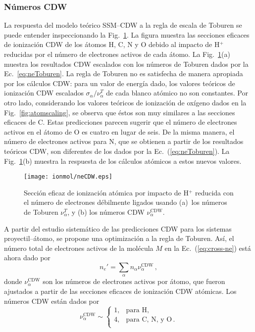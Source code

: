 \subsubsection{Números CDW}
\label{subsec:CDW}

La respuesta del modelo teórico SSM--CDW a la regla de escala de Toburen 
se puede entender inspeccionando la Fig.~\ref{fig:neCDW}. La figura 
muestra las secciones eficaces de ionización CDW de los átomos H, C, N y 
O debido al impacto de H$^+$ reducidas por el número de electrones 
activos de cada átomo. La Fig.~\ref{fig:neCDW}(a) muestra los resultados 
CDW escalados con los números de Toburen dados por la 
Ec.~\ref{eq:neToburen}. La regla de Toburen no es satisfecha de manera 
apropiada por los cálculos CDW: para un valor de energía dado, los 
valores teóricos de ionización CDW escalados 
$\sigma_{\alpha}/\nu_{\alpha}^T$ de cada blanco atómico no son 
constantes. Por otro lado, considerando los valores teóricos de 
ionización de oxígeno dados en la Fig.~\ref{fig:atomscaling}, se observa
que éstos son muy similares a las secciones eficaces de C. Estas 
predicciones parecen sugerir que el número de electrones activos en el 
átomo de O es cuatro en lugar de seis. De la misma manera, el número de 
electrones activos para N, que se obtienen a partir de los resultados 
teóricos CDW, son diferentes de los dados por la 
Ec.~(\ref{eq:neToburen}). La Fig.~\ref{fig:neCDW}(b) muestra la 
respuesta de los cálculos atómicos a estos nuevos valores.

\begin{figure}[t]
\centering
\texttt{[image: ionmol/neCDW.eps]}
\caption[Sección eficaz de ionización atómica reducida por $n_e$.]
{Sección eficaz de ionización atómica por impacto de H$^+$ reducida con 
el número de electrones débilmente ligados usando 
(a)~los números de Toburen $\nu_{\alpha}^T$, y 
(b) los números CDW $\nu_{\alpha}^{\text{CDW}}$.}
\label{fig:neCDW}
\end{figure}

A partir del estudio sistemático de las predicciones CDW para los 
sistemas proyectil--átomo, se propone una optimización a la regla de 
Toburen. Así, el número total de electrones activos de la molécula $M$ 
en la Ec.~(\ref{eq:cross-ne}) está ahora dado por 
\begin{equation}
n_e'=\sum_{\alpha}n_{\alpha}\nu_{\alpha}^{\text{CDW}}\,,
\end{equation}
donde $\nu_{\alpha}^{\text{CDW}}$ son los números de electrones activos 
por átomo, que fueron ajustados a partir de las secciones eficaces 
de ionización CDW atómicas. Los números CDW están dados por
\begin{equation}
\nu_{\alpha }^{\text{CDW}} \sim\left\{ 
\begin{array}{ll}
1, & \text{para H,} \\
4, & \text{para C, N, y O}\,. \\ 
\end{array}
\right. 
\label{eq:neCDW}
\end{equation}

